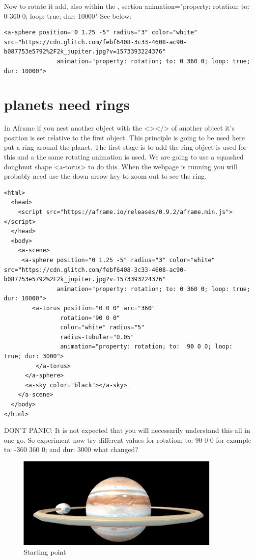 Now to rotate it  add, also within the , section animation="property: rotation; to: 0 360 0; loop: true; dur: 10000" See below:

\begin{lstlisting}
<a-sphere position="0 1.25 -5" radius="3" color="white" src="https://cdn.glitch.com/febf6408-3c33-4608-ac90-b087753e5792%2F2k_jupiter.jpg?v=1573393224376"
               animation="property: rotation; to: 0 360 0; loop: true; dur: 10000">
\end{lstlisting}

\section{planets need rings}
In Aframe if you nest another object with the <></> of another object it's position is set relative to the first object. This principle is going to be used here put a ring around the planet. The first stage is to add the ring object is used for this and a the same rotating animation is used. We are going to use a squashed doughnut shape <a-torus> to do this. When the webpage is running you will probably need use the down arrow key to zoom out to see the ring.

\begin{lstlisting}
<html>
  <head>
    <script src="https://aframe.io/releases/0.9.2/aframe.min.js"></script>
  </head>
  <body>
    <a-scene>
     <a-sphere position="0 1.25 -5" radius="3" color="white" src="https://cdn.glitch.com/febf6408-3c33-4608-ac90-b087753e5792%2F2k_jupiter.jpg?v=1573393224376"
               animation="property: rotation; to: 0 360 0; loop: true; dur: 10000">
        <a-torus position="0 0 0" arc="360"
                rotation="90 0 0"
                color="white" radius="5"
                radius-tubular="0.05"
                animation="property: rotation; to:  90 0 0; loop: true; dur: 3000">
         </a-torus>
      </a-sphere>   
      <a-sky color="black"></a-sky>
    </a-scene>
  </body>
</html>
\end{lstlisting}

DON'T PANIC: It is not expected that you will necessarily understand this all in one go. So experiment now try different values for rotation; to:  90 0 0  for example to:  -360 360 0; and dur: 3000 what changed? 

\begin{figure}
    \centering
    \includegraphics[width=10cm]{chapters/chapter2/figures/Picture1.png}
    \caption{Starting point}
    \label{fig:Picture1}
\end{figure}


